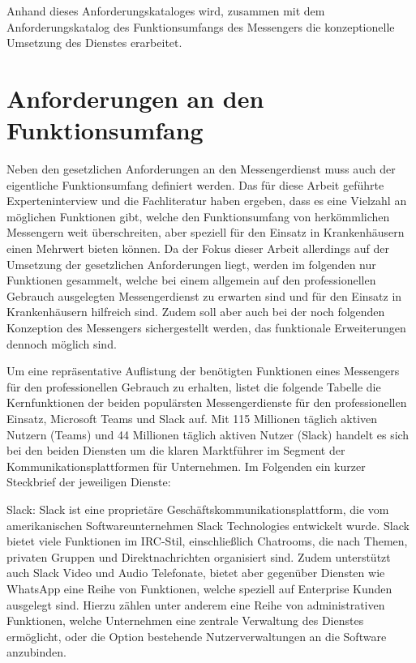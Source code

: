Anhand dieses Anforderungskataloges wird, zusammen mit dem Anforderungskatalog des Funktionsumfangs des Messengers die konzeptionelle Umsetzung des Dienstes erarbeitet.

\section{Anforderungen an den Funktionsumfang}\label{section:pdimsbd}
Neben den gesetzlichen Anforderungen an den Messengerdienst muss auch der eigentliche Funktionsumfang definiert werden. Das für diese Arbeit geführte Experteninterview und die Fachliteratur haben ergeben, dass es eine Vielzahl an möglichen Funktionen gibt, welche den Funktionsumfang von herkömmlichen Messengern weit überschreiten, aber speziell für den Einsatz in Krankenhäusern einen Mehrwert bieten können.
Da der Fokus dieser Arbeit allerdings auf der Umsetzung der gesetzlichen Anforderungen liegt, werden im folgenden nur Funktionen gesammelt, welche bei einem allgemein auf den professionellen Gebrauch ausgelegten Messengerdienst zu erwarten sind und für den Einsatz in Krankenhäusern hilfreich sind. Zudem soll aber auch bei der noch folgenden Konzeption des Messengers sichergestellt werden, das funktionale Erweiterungen dennoch möglich sind.

Um eine repräsentative Auflistung der benötigten Funktionen eines Messengers für den professionellen Gebrauch zu erhalten, listet die folgende Tabelle die Kernfunktionen der beiden populärsten Messengerdienste für den professionellen Einsatz, Microsoft Teams und Slack auf.
Mit 115 Millionen täglich aktiven Nutzern (Teams) und 44 Millionen täglich aktiven Nutzer (Slack) handelt es sich bei den beiden Diensten um die klaren Marktführer im Segment der Kommunikationsplattformen für Unternehmen. Im Folgenden ein kurzer Steckbrief der jeweiligen Dienste:

Slack: Slack ist eine proprietäre Geschäftskommunikationsplattform, die vom amerikanischen Softwareunternehmen Slack Technologies entwickelt wurde. Slack bietet viele Funktionen im IRC-Stil, einschließlich Chatrooms, die nach Themen, privaten Gruppen und Direktnachrichten organisiert sind. Zudem unterstützt auch Slack Video und Audio Telefonate, bietet aber gegenüber Diensten wie WhatsApp eine Reihe von Funktionen, welche speziell auf Enterprise Kunden ausgelegt sind. Hierzu zählen unter anderem eine Reihe von administrativen Funktionen, welche Unternehmen eine zentrale Verwaltung des Dienstes ermöglicht, oder die Option bestehende Nutzerverwaltungen an die Software anzubinden.

